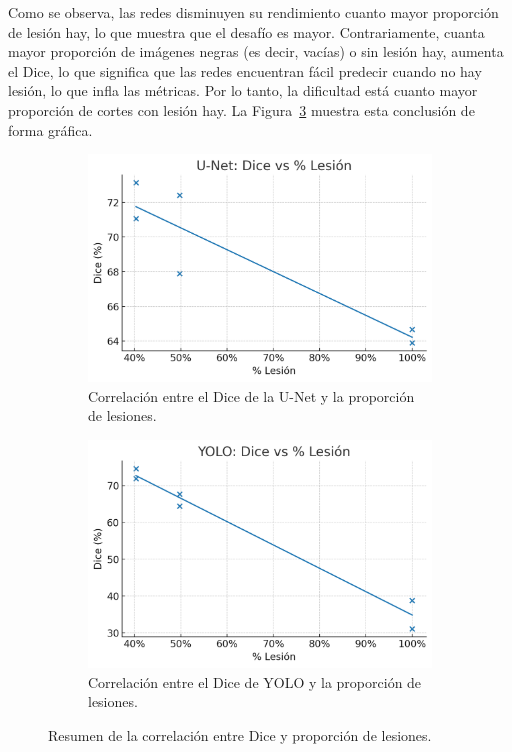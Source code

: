 \documentclass[../main.tex]{subfiles}
\begin{document}
Como se observa, las redes disminuyen su rendimiento cuanto mayor proporción de lesión hay, lo que muestra que el desafío es mayor. Contrariamente, cuanta mayor proporción de imágenes negras (es decir, vacías) o sin lesión hay, aumenta el Dice, lo que significa que las redes encuentran fácil predecir cuando no hay lesión, lo que infla las métricas. Por lo tanto, la dificultad está cuanto mayor proporción de cortes con lesión hay. La Figura~\ref{fig:all_dice_vs_lesion} muestra esta conclusión de forma gráfica.

\begin{figure}[H]
    \centering
    \begin{subfigure}[b]{0.48\linewidth}
        \centering
        \includegraphics[width=\linewidth]{imgs/resultados/corr/unet_dice_vs_lesion.png}
        \caption{Correlación entre el Dice de la U-Net y la proporción de lesiones.}
        \label{fig:unet_dice_vs_lesion}
    \end{subfigure}
    \hfill
    \begin{subfigure}[b]{0.48\linewidth}
        \centering
        \includegraphics[width=\linewidth]{imgs/resultados/corr/yolo_dice_vs_lesion.png}
        \caption{Correlación entre el Dice de YOLO y la proporción de lesiones.}
        \label{fig:yolo_dice_vs_lesion}
    \end{subfigure}
    \caption{Resumen de la correlación entre Dice y proporción de lesiones.}
    \label{fig:all_dice_vs_lesion}
\end{figure}
\end{document}
